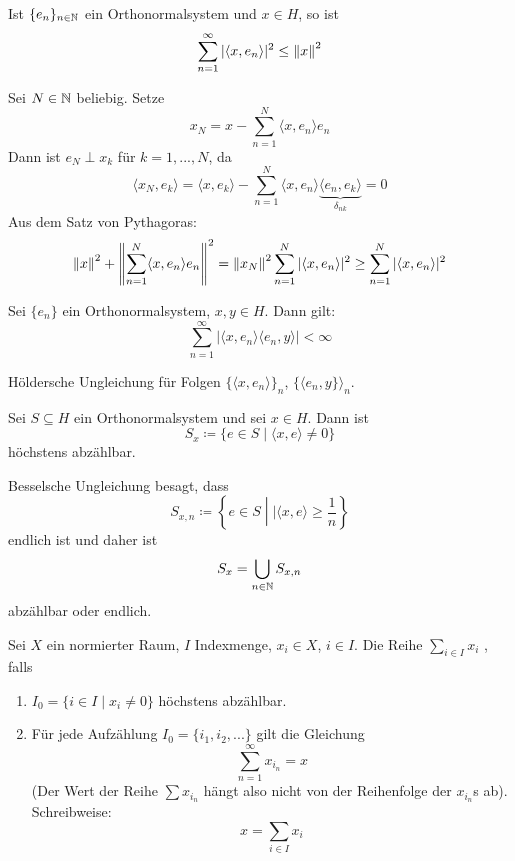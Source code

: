 \begin{satz}
	Ist $ \lbrace e_n\rbrace_{n\in\mathbb{N}} $ ein Orthonormalsystem und $ x\in H $, so ist
	\[ \sum_{n=1}^{\infty}|\langle x,e_n\rangle|^2\leq\left\|x\right\|^2 \]
\end{satz}
\begin{beweis}
	Sei $ N\in\mathbb{N} $ beliebig. Setze
	\[ x_N=x-\sum_{n=1}^N \langle x,e_n\rangle e_n \]
	Dann ist $ e_N\perp x_k $ f\"ur $ k=1,...,N $, da
	\[ \langle x_N,e_k\rangle=\langle x,e_k\rangle-\sum_{n=1}^{N}\langle x,e_n\rangle\underbrace{\langle e_n,e_k\rangle}_{\delta_{nk}}=0 \]
	Aus dem Satz von Pythagoras:
	\[ \left\|x\right\|^2+\left\|\sum_{n=1}^{N}\langle x,e_n\rangle e_n\right\|^2=\left\|x_N\right\|^2\sum_{n=1}^{N}|\langle x,e_n\rangle|^2\geq\sum_{n=1}^{N}|\langle x,e_n\rangle|^2 \]
\end{beweis}
\begin{lemma}
	Sei $ \lbrace e_n\rbrace $ ein Orthonormalsystem, $ x,y\in H $. Dann gilt:
	\[ \sum_{n=1}^\infty|\langle x,e_n\rangle\langle e_n,y\rangle|<\infty \]
\end{lemma}
\begin{beweis}
	H\"oldersche Ungleichung f\"ur Folgen $ \lbrace\langle x,e_n\rangle\rbrace_n $, $ \lbrace\langle e_n,y\rbrace\rangle_n $.
\end{beweis}
\begin{lemma}
	Sei $ S\subseteq H $ ein Orthonormalsystem und sei $ x\in H $. Dann ist
	\[ S_x\coloneqq\lbrace e\in S\mid \langle x,e\rangle\neq 0\rbrace \]
	h\"ochstens abz\"ahlbar.
\end{lemma}
\begin{beweis}
	Besselsche Ungleichung besagt, dass
	\[ S_{x,n}\coloneqq\left\lbrace e\in S\middle| |\langle x,e\rangle\geq\frac{1}{n}\right\rbrace \]
	endlich ist und daher ist
	\[ S_x=\bigcup_{n\in\mathbb{N}} S_{x,n} \]
	abz\"ahlbar oder endlich.
\end{beweis}
\begin{definition}
	Sei $ X $ ein normierter Raum, $ I $ Indexmenge, $ x_i\in X $, $ i\in I $. Die Reihe $ \sum_{i\in I} x_i $ , falls 
	\begin{enumerate}
		\item $ I_0=\lbrace i\in I\mid x_i\neq 0\rbrace $ h\"ochstens abz\"ahlbar.
		\item F\"ur jede Aufz\"ahlung $ I_0=\lbrace i_1,i_2,...\rbrace $ gilt die Gleichung
		\[ \sum_{n=1}^\infty x_{i_n}=x \]
		(Der Wert der Reihe $ \sum x_{i_n} $ h\"angt also nicht von der Reihenfolge der $ x_{i_n} $s ab).
		Schreibweise:
		\[ x=\sum_{i\in I} x_i \]
	\end{enumerate}
\end{definition}

